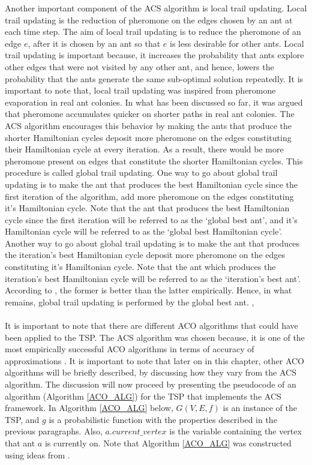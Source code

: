 \documentclass[12pt]{article}
\numberwithin{equation}{subsection}
\numberwithin{table}{subsection}
\numberwithin{algorithm}{subsection}
\numberwithin{figure}{subsection}
\begin{document}
Another important component of the ACS algorithm is local trail updating. Local trail updating is the reduction of pheromone on the edges chosen by an ant at each time step. The aim of local trail updating is to reduce the pheromone of an edge $e$, after it is chosen by an ant so that $e$ is less desirable for other ants. Local trail updating is important because, it increases the probability that ants explore other edges that were not visited by any other ant, and hence, lowers the probability that the ants generate the same sub-optimal solution repeatedly. It is important to note that, local trail updating was inspired from pheromone evaporation in real ant colonies. In what has been discussed so far, it was argued that pheromone accumulates quicker on shorter paths in real ant colonies. The ACS algorithm encourages this behavior by making the ants that produce the shorter Hamiltonian cycles deposit more pheromone on the edges constituting their Hamiltonian cycle at every iteration. As a result, there would be more pheromone present on edges that constitute the shorter Hamiltonian cycles. This procedure is called global trail updating. One way to go about global trail updating is to make the ant that produces the best Hamiltonian cycle since the first iteration of the algorithm, add more pheromone on the edges constituting it's Hamiltonian cycle. Note that the ant that produces the best Hamiltonian cycle since the first iteration will be referred to as the `global best ant', and it's Hamiltonian cycle will be referred to as the `global best Hamiltonian cycle'. Another way to go about global trail updating is to make the ant that produces the iteration's best Hamiltonian cycle deposit more pheromone on the edges constituting it's Hamiltonian cycle. Note that the ant which produces the iteration's best Hamiltonian cycle will be referred to as the `iteration's best ant'. According to \cite{dorigo_stutzle_thomas_2004}, the former is better than the latter empirically. Hence, in what remains, global trail updating is performed by the global best ant. \cite{dorigo_gambardella_1997}, \cite{dorigo_stutzle_thomas_2004} \\\\
It is important to note that there are different ACO algorithms that could have been applied to the TSP. The ACS algorithm was chosen because, it is one of the most empirically successful ACO algorithms in terms of accuracy of approximations \cite{dorigo_stutzle_thomas_2004}. It is important to note that later on in this chapter, other ACO algorithms will be briefly described, by discussing how they vary from the ACS algorithm. The discussion will now proceed by presenting the pseudocode of an algorithm (Algorithm \ref{ACO_ALG}) for the TSP that implements the ACS framework. In Algorithm \ref{ACO_ALG} below, $G(V,E,f)$ is an instance of the TSP, and $g$ is a probabilistic function with the properties described in the previous paragraphs. Also, $a.current\_vertex$ is the variable containing the vertex that ant $a$ is currently on. Note that Algorithm \ref{ACO_ALG} was constructed using ideas from \cite{dorigo_gambardella_1997}.
\end{document}
